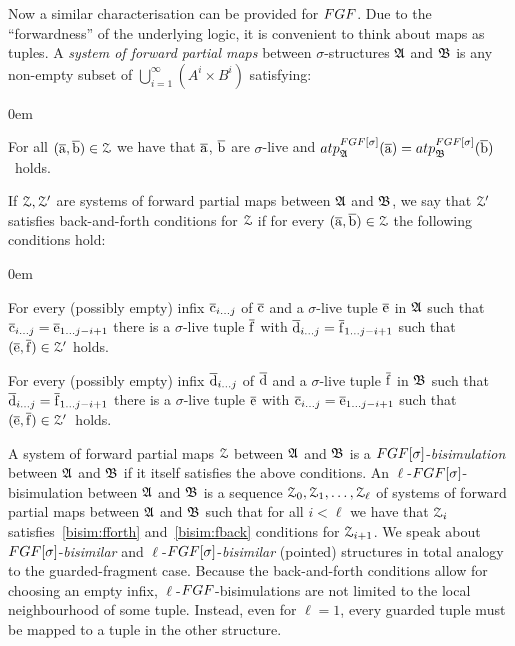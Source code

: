 \noindent
Now a similar characterisation can be provided for $\FGF$. 
Due to the ``forwardness'' of the underlying logic, it is convenient to think about maps as tuples.
A \emph{system of forward partial maps} between $\sigma$-structures ${\mathfrak{A}}$ and ${\mathfrak{B}}$ is any non-empty subset of $\bigcup_{i=1}^{\infty} (A^i \times B^i)$ satisfying:
\begin{description}\itemsep0em
  \item[\desclabel{(AtomicEq)}{bisim:atomiceq}] For all $(\overline{\mathrm{a}}, \overline{\mathrm{b}}) \in \mathcal{Z}$ we have that $\overline{\mathrm{a}}$, $\overline{\mathrm{b}}$ are $\sigma$-live and $\atp{\FGF[\sigma]}{\str{A}}{\elemtuplea} = \atp{\FGF[\sigma]}{\str{B}}{\elemtupleb}$~holds.
\end{description}
If $\mathcal{Z}, \mathcal{Z}'$ are systems of forward partial maps between ${\mathfrak{A}}$ and ${\mathfrak{B}}$, we say that $\mathcal{Z}'$ satisfies back-and-forth conditions for $\mathcal{Z}$ if for every $(\overline{\mathrm{a}}, \overline{\mathrm{b}}) \in \mathcal{Z}$ the following conditions hold:
\begin{description}\itemsep0em
  \item[\desclabel{(fForth)}{bisim:fforth}] For every (possibly empty) infix $\overline{\mathrm{c}}_{i\ldots j}$ of $\overline{\mathrm{c}}$ and a $\sigma$-live tuple $\overline{\mathrm{e}}$ in ${\mathfrak{A}}$ such that $\overline{\mathrm{c}}_{i\ldots j} = \overline{\mathrm{e}}_{1\ldots j{-}i{+}1}$ there is a $\sigma$-live tuple $\overline{\mathrm{f}}$ with $\overline{\mathrm{d}}_{i\ldots j} = {\overline{\mathrm{f}}}_{1\dots j{-}i{+}1}$ such that $(\overline{\mathrm{e}}, \overline{\mathrm{f}}) \in \mathcal{Z}'$ holds.
  \item[\desclabel{(fBack)}{bisim:fback}] For every (possibly empty) infix $\overline{\mathrm{d}}_{i\ldots j}$ of $\overline{\mathrm{d}}$ and a $\sigma$-live tuple $\overline{\mathrm{f}}$ in ${\mathfrak{B}}$ such that $\overline{\mathrm{d}}_{i\ldots j} = {\overline{\mathrm{f}}}_{1\dots j{-}i{+}1}$ there is a $\sigma$-live tuple $\overline{\mathrm{e}}$ with $\overline{\mathrm{c}}_{i\ldots j} = \overline{\mathrm{e}}_{1\ldots j{-}i{+}1}$ such that $(\overline{\mathrm{e}}, \overline{\mathrm{f}}) \in \mathcal{Z}'$~holds.
\end{description}
A system of forward partial maps $\mathcal{Z}$ between ${\mathfrak{A}}$ and ${\mathfrak{B}}$ is a $\FGF[\sigma]$-\emph{bisimulation} between ${\mathfrak{A}}$ and ${\mathfrak{B}}$ if it itself satisfies the above conditions.
An $\ell$-$\FGF[\sigma]$-bisimulation between ${\mathfrak{A}}$ and ${\mathfrak{B}}$ is a sequence $\mathcal{Z}_0, \mathcal{Z}_1, \ldots, \mathcal{Z}_\ell$ of systems of forward partial maps between ${\mathfrak{A}}$ and ${\mathfrak{B}}$ such that for all $i < \ell$ we have that $\mathcal{Z}_i$ satisfies~\ref{bisim:fforth} and~\ref{bisim:fback} conditions for $\mathcal{Z}_{i{+}1}$.
We speak about $\FGF[\sigma]$-\emph{bisimilar} and $\ell$-$\FGF[\sigma]$-\emph{bisimilar} (pointed) structures in total analogy to the guarded-fragment case.
Because the back-and-forth conditions allow for choosing an empty infix, $\ell$-$\FGF$-bisimulations are not limited to the local neighbourhood of some tuple.
Instead, even for $\ell = 1$, every guarded tuple must be mapped to a tuple in the other structure.

